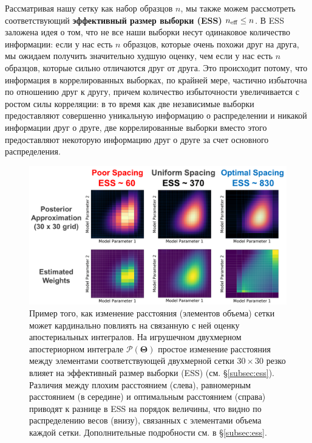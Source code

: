 \documentclass[12pt, titlepage]{article}
\newcommand{\params}{\ensuremath{\boldsymbol\Theta}}
\newcommand{\posterior}{\ensuremath{\mathcal{P}}}
\begin{document}
Рассматривая нашу сетку как набор образцов $n$, мы также можем рассмотреть соответствующий \textbf{эффективный размер выборки (ESS)} $n_{\rm eff} \leq n$. В ESS заложена идея о том, что не все наши выборки несут одинаковое количество информации: если у нас есть $n$ образцов, которые очень похожи друг на друга, мы ожидаем получить значительно худшую оценку, чем если у нас есть $n$ образцов, которые сильно отличаются друг от друга. Это происходит потому, что информация в коррелированных выборках, по крайней мере, частично избыточна по отношению друг к другу, причем количество избыточности увеличивается с ростом силы корреляции: в то время как две независимые выборки предоставляют совершенно уникальную информацию о распределении и никакой информации друг о друге, две коррелированные выборки вместо этого предоставляют некоторую информацию друг о друге за счет основного распределения.

\begin{figure}
\begin{center}
\includegraphics[width=\textwidth]{figures/fig4.png}
\end{center}
\caption{Пример того, как изменение расстояния (элементов объема) сетки может кардинально повлиять на связанную с ней оценку апостериальных интегралов. На игрушечном двухмерном апостериорном интеграле $\posterior(\params)$ простое изменение расстояния между элементами соответствующей двухмерной сетки $30 \times 30$ резко влияет на эффективный размер выборки (ESS) (см. \S\ref{subsec:ess}). Различия между плохим расстоянием (слева), равномерным расстоянием (в середине) и оптимальным расстоянием (справа) приводят к разнице в ESS на порядок величины, что видно по распределению весов (внизу), связанных с элементами объема каждой сетки. Дополнительные подробности см. в \S\ref{subsec:ess}.
}\label{fig:ess}
\end{figure}
\end{document}
